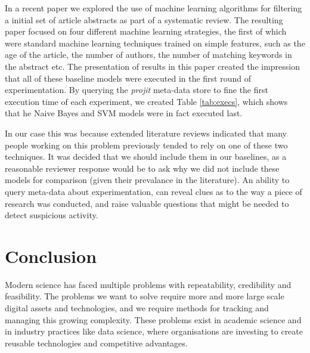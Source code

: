 \documentclass[sigconf]{acmart}
\begin{document}
In a recent paper we explored the use of machine learning algorithms for filtering a initial
set of article abstracts as part of a systematic review\cite{HawkinsTivey2023}. 
The resulting paper focused on four
different machine learning strategies, the first of which were standard machine learning techniques
trained on simple features, such as the age of the article, the number of authors, the number of 
matching keywords in the abstract etc. The presentation of results in this paper created the impression
that all of these baseline models were executed in the first round of experimentation. By querying
the \emph{projit} meta-data store to fine the first execution time of each experiment, we created
Table \ref{tab:execs}, which shows that he Naive Bayes and SVM models were in fact executed last. 

\begin{table}
\caption{Experiment Executions}
\label{tab:execs}
\end{table}

In our case this was because extended literature reviews indicated that many people working on this
problem previously tended to rely on one of these two techniques. It was decided that we should include
them in our baselines, as a reasonable reviewer response would be to ask why we did not include these
models for comparison (given their prevalance in the literature). An ability to query meta-data about
experimentation, can reveal clues as to the way a piece of research was conducted, and raise valuable
questions that might be needed to detect suspicious activity.



\section{Conclusion}
 
Modern science has faced multiple problems with repeatability, credibility and feasibility. The problems
we want to solve require more and more large scale digital assets and technologies, and we require methods 
for tracking and managing this growing complexity. These problems exist in academic science and in industry
practices like data science, where organisations are investing to create reusable technologies and 
competitive advantages. 
\end{document}
